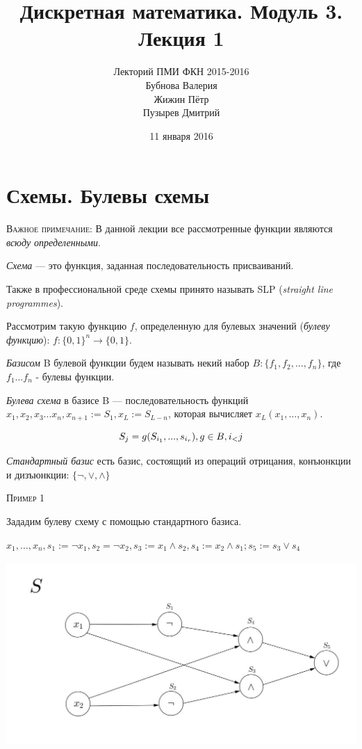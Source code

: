 \documentclass[a4paper, 12pt]{article}
\begin{document}
\title{Дискретная математика. Модуль 3. Лекция 1}
\author{Лекторий ПМИ ФКН 2015-2016\\Бубнова Валерия\\Жижин Пётр\\Пузырев Дмитрий}
\date{11 января 2016}

\maketitle
\section*{Схемы. Булевы схемы}
\textsc{Важное примечание:} В данной лекции все рассмотренные функции являются \textit{всюду определенными}.

\textit{Схема} --- это функция, заданная последовательность присваиваний.

Также в профессиональной среде схемы принято называть SLP (\textit{straight line programmes}). 

Рассмотрим такую функцию $f$, определенную для булевых значений (\textit{булеву функцию}): $f:\{0, 1\}^n \rightarrow \{0, 1\}$.

\textit{Базисом} B булевой функции будем называть некий набор $B:\{f_1, f_2, \ldots , f_n\}$, где $f_1 \ldots f_n$ - булевы функции.

\textit{Булева схема} в базисе B  --- последовательность функций $x_1, x_2, x_3... x_n, x_{n+1} := S_1, x_L := S_{L-n}$, которая вычисляет $x_L(x_1, \ldots ,x_n)$. 

\[S_j = g(S_{i_1},  ... , s_{i_r}), g \in B, i_\mathalpha < j\]

\textit{Стандартный базис} есть базис, состоящий из операций отрицания, конъюнкции и дизъюнкции: $\{\lnot, \vee, \wedge\}$

\textsc{Пример 1}

Зададим булеву схему с помощью стандартного базиса.

$x_1, \ldots ,x_n, s_1 := \lnot x_1, s_2 = \lnot x_2, s_3 := x_1 \wedge s_2, s_4 := x_2 \wedge s_1; s_5 := s_3 \vee s_4$

\includegraphics[height=7cm]{Images/1.png}
 
\end{document}
